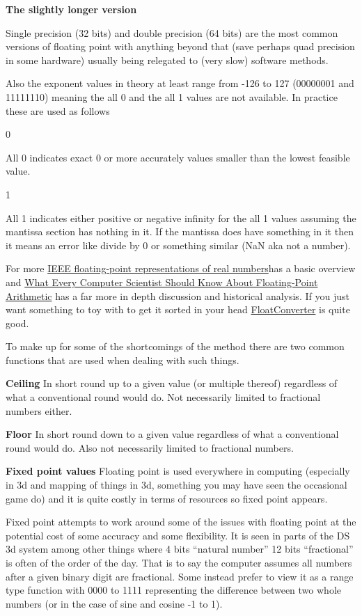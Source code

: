 \documentclass[
]{book}
\begin{document}
\textbf{The slightly longer version}

Single precision (32 bits) and double precision (64 bits) are the most common versions of floating point with anything beyond that (save perhaps quad precision in some hardware) usually being relegated to (very slow) software methods.

Also the exponent values in theory at least range from -126 to 127 (00000001 and 11111110) meaning the all 0 and the all 1 values are not available. In practice these are used as follows

0

All 0 indicates exact 0 or more accurately values smaller than the lowest feasible value.

1

All 1 indicates either positive or negative infinity for the all 1 values assuming the mantissa section has nothing in it. If the mantissa does have something in it then it means an error like divide by 0 or something similar (NaN aka not a number).

For more \href{http://www.math.grin.edu/~rebelsky/Courses/152/97F/Readings/IEEE-reals.html}{IEEE floating-point representations of real numbers}has a basic overview and \href{http://docs.oracle.com/cd/E19957-01/806-3568/ncg_goldberg.html}{What Every Computer Scientist Should Know About Floating-Point Arithmetic} has a far more in depth discussion and historical analysis. If you just want something to toy with to get it sorted in your head \href{http://www.h-schmidt.net/FloatConverter/IEEE754.html}{FloatConverter} is quite good.

To make up for some of the shortcomings of the method there are two common functions that are used when dealing with such things.

\textbf{Ceiling} In short round up to a given value (or multiple thereof) regardless of what a conventional round would do. Not necessarily limited to fractional numbers either.

\textbf{Floor} In short round down to a given value regardless of what a conventional round would do. Also not necessarily limited to fractional numbers.

\textbf{Fixed point values} Floating point is used everywhere in computing (especially in 3d and mapping of things in 3d, something you may have seen the occasional game do) and it is quite costly in terms of resources so fixed point appears.

Fixed point attempts to work around some of the issues with floating point at the potential cost of some accuracy and some flexibility. It is seen in parts of the DS 3d system among other things where 4 bits ``natural number'' 12 bits ``fractional'' is often of the order of the day. That is to say the computer assumes all numbers after a given binary digit are fractional. Some instead prefer to view it as a range type function with 0000 to 1111 representing the difference between two whole numbers (or in the case of sine and cosine -1 to 1).
\end{document}
